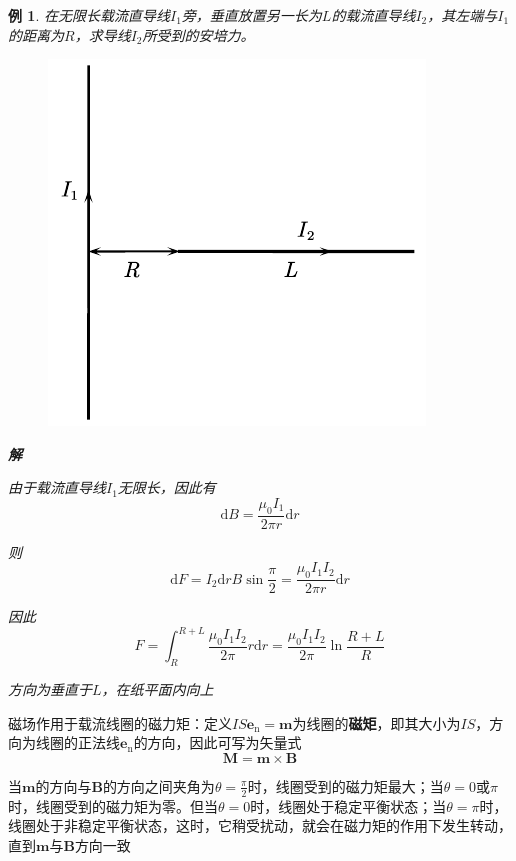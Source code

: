 \documentclass[12pt, a4paper, twoside]{ctexbook}
\newtheorem{example}[theorem]{例}
\begin{document}
\begin{example}
    在无限长载流直导线$I_1$旁，垂直放置另一长为$L$的载流直导线$I_2$，其左端与$I_1$的距离为$R$，求导线$I_2$所受到的安培力。
    \begin{figure}[H]
        \centerline{\includegraphics[scale=0.90]{CH10EX07.pdf}}
    \end{figure}
    
    \noindent\textbf{解}
    
    由于载流直导线$I_1$无限长，因此有
    $$
    \mathrm{d}B=\frac{\mu_0I_1}{2\pi r}\mathrm{d}r
    $$

    则
    $$
    \mathrm{d}F=I_2\mathrm{d}rB\sin\frac{\pi}{2}=\frac{\mu_0I_1I_2}{2\pi r}\mathrm{d}r
    $$

    因此
    $$
    F=\int_{R}^{R+L}\frac{\mu_0I_1I_2}{2\pi}r\mathrm{d}r=\frac{\mu_0I_1I_2}{2\pi}\ln\frac{R+L}{R}
    $$
    
    方向为垂直于$L$，在纸平面内向上
\end{example}

{\sonti 磁场作用于载流线圈的磁力矩}：定义$IS\boldsymbol{e}_\mathrm{n}=\boldsymbol{m}$为线圈的\textbf{磁矩}，即其大小为$IS$，方向为线圈的正法线$\boldsymbol{e}_\mathrm{n}$的方向，因此可写为矢量式
$$
\boldsymbol{M}=\boldsymbol{m}\times\boldsymbol{B}
$$

当$\boldsymbol{m}$的方向与$\boldsymbol{B}$的方向之间夹角为$\theta=\frac{\pi}{2}$时，线圈受到的磁力矩最大；当$\theta=0$或$\pi$时，线圈受到的磁力矩为零。但当$\theta=0$时，线圈处于稳定平衡状态；当$\theta=\pi$时，线圈处于非稳定平衡状态，这时，它稍受扰动，就会在磁力矩的作用下发生转动，直到$\boldsymbol{m}$与$\boldsymbol{B}$方向一致
\end{document}
